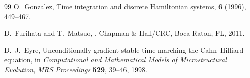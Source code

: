 \documentclass[11pt]{article}
\begin{document}
\begin{thebibliography}{99}
O.~Gonzalez,
\newblock Time integration and discrete Hamiltonian systems,
 \textbf{6} (1996), 449--467.

D.~Furihata and T.~Matsuo,
,
\newblock Chapman \& Hall/CRC, Boca Raton, FL, 2011.

D.~J.~Eyre,
\newblock Unconditionally gradient stable time marching the Cahn--Hilliard equation,
\newblock in {\em Computational and Mathematical Models of Microstructural Evolution},
{\em MRS Proceedings} \textbf{529}, 39--46, 1998.

\end{thebibliography}
\end{document}
